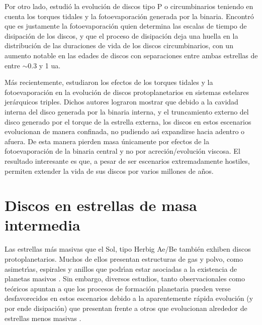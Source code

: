 \documentclass[baaa]{baaa}
\begin{document}
Por otro lado, \citet{Alexander2012} estudi\'o la evoluci\'on de discos tipo P o circumbinarios teniendo en cuenta los torques tidales y la fotoevaporaci\'on generada por la binaria. Encontr\'o que es justamente la fotoevaporaci\'on quien determina las escalas de tiempo de disipaci\'on de los discos, y que el proceso de disipaci\'on deja una huella en la distribuci\'on de las duraciones de vida de los discos circumbinarios, con un aumento notable en las edades de discos con separaciones entre ambas estrellas de entre $\sim$0.3 y 1 ua.

M\'as recientemente, \citet{Ronco2021} estudiaron los efectos de los torques tidales y la fotoevaporaci\'on en la evoluci\'on de discos protoplanetarios en sistemas estelares jer\'arquicos triples. Dichos autores lograron mostrar que debido a la cavidad interna del disco generada por la binaria interna, y el truncamiento externo del disco generado por el torque de la estrella externa, los discos en estos escenarios evolucionan de manera confinada, no pudiendo as\'{\i} expandirse hacia adentro o afuera. De esta manera pierden masa \'unicamente por efectos de la fotoevaporaci\'on de la binaria central y no por acreci\'on/evoluci\'on viscosa. El resultado interesante es que, a pesar de ser escenarios extremadamente hostiles, permiten extender la vida de sus discos por varios millones de a\~nos. 

\section{Discos en estrellas de masa intermedia}

Las estrellas m\'as masivas que el Sol, tipo Herbig Ae/Be tambi\'en exhiben discos protoplanetarios. Muchos de ellos presentan estructuras de gas y polvo, como asimetr\'{\i}as, espirales y anillos que podr\'{\i}an estar asociadas a la existencia de planetas masivos \citep{Dong2015,Pinte2018}. 
Sin embargo, diversos estudios, tanto observacionales como te\'oricos apuntan a que los procesos de formaci\'on planetaria pueden verse desfavorecidos en estos escenarios debido a la aparentemente r\'apida evoluci\'on (y por ende disipaci\'on) que presentan frente a otros que evolucionan alrededor de estrellas menos masivas \citep{KennedyKenyon2009,Ribas2015,Kunitomo2021,Luhman2022}. 
\end{document}
